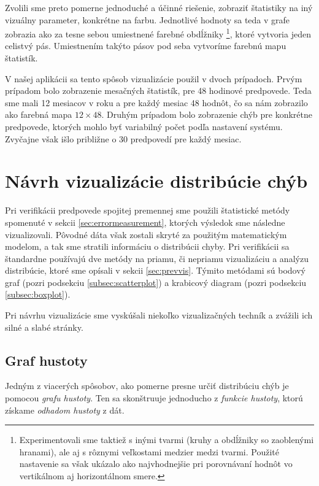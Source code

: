 Zvolili sme preto pomerne jednoduché a účinné riešenie, zobraziť štatistiky na iný vizuálny parameter, konkrétne na farbu. Jednotlivé hodnoty sa teda v grafe zobrazia ako za tesne sebou umiestnené farebné obdĺžniky \footnote{Experimentovali sme taktiež s inými tvarmi (kruhy a obdĺžniky so zaoblenými hranami), ale aj s rôznymi veľkostami medzier medzi tvarmi. Použité nastavenie sa však ukázalo ako najvhodnejšie pri porovnávaní hodnôt vo vertikálnom aj horizontálnom smere.}, ktoré vytvoria jeden celistvý pás. Umiestnením takýto pásov pod seba vytvoríme farebnú mapu štatistík. 

V našej aplikácii sa tento spôsob vizualizácie použil v dvoch prípadoch. Prvým prípadom bolo zobrazenie mesačných štatistík, pre 48 hodinové predpovede. Teda sme mali 12 mesiacov v roku a pre každý mesiac 48 hodnôt, čo sa nám zobrazilo ako farebná mapa $ 12 \times 48 $. Druhým prípadom bolo zobrazenie chýb pre konkrétne predpovede, ktorých mohlo byť variabilný počet podľa nastavení systému. Zvyčajne však išlo približne o 30 predpovedí pre každý mesiac.






\section{Návrh vizualizácie distribúcie chýb}
Pri verifikácii predpovede spojitej premennej sme použili štatistické metódy spomenuté v sekcii \ref{sec:errormeasurement}, ktorých výsledok sme následne vizualizovali. Pôvodné dáta však zostali skryté za použitým matematickým modelom, a tak sme stratili informáciu o distribúcii chyby. Pri verifikácii sa štandardne používajú dve metódy na priamu, či nepriamu vizualizáciu a analýzu distribúcie, ktoré sme opísali v sekcii \ref{sec:prevvis}. Týmito metódami sú bodový graf (pozri podsekciu \ref{subsec:scatterplot}) a krabicový diagram (pozri podsekciu \ref{subsec:boxplot}).

Pri návrhu vizualizácie sme vyskúšali niekoľko vizualizačných techník a zvážili ich silné a slabé stránky. 

\subsection{Graf hustoty} %

Jedným z viacerých spôsobov, ako pomerne presne určiť distribúciu chýb je pomocou \textit{grafu hustoty}. Ten sa skonštruuje jednoducho z \textit{funkcie hustoty}, ktorú získame \textit{odhadom hustoty} z dát. 

